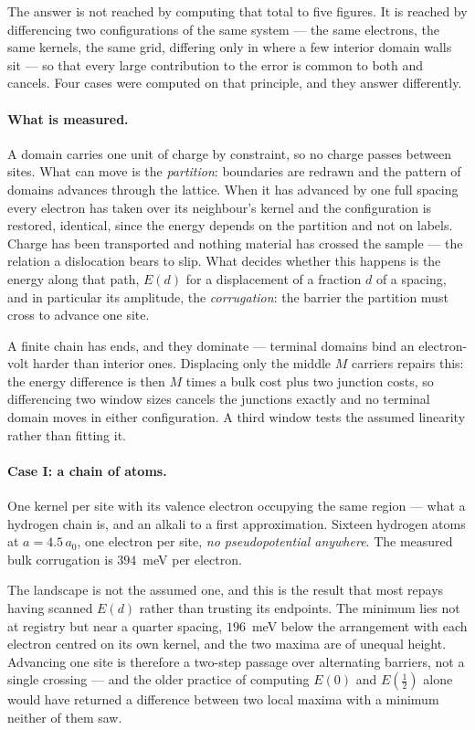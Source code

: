 The answer is not reached by computing that total to five figures. It is reached by differencing two
configurations of the same system --- the same electrons, the same kernels, the same grid, differing
only in where a few interior domain walls sit --- so that every large contribution to the error is
common to both and cancels. Four cases were computed on that principle, and they answer differently.

\paragraph{What is measured.}
A domain carries one unit of charge by constraint, so no charge passes between sites. What can move
is the \emph{partition}: boundaries are redrawn and the pattern of domains advances through the
lattice. When it has advanced by one full spacing every electron has taken over its neighbour's
kernel and the configuration is restored, identical, since the energy depends on the partition and
not on labels. Charge has been transported and nothing material has crossed the sample --- the
relation a dislocation bears to slip. What decides whether this happens is the energy along that
path, $E(d)$ for a displacement of a fraction $d$ of a spacing, and in particular its amplitude, the
\emph{corrugation}: the barrier the partition must cross to advance one site.

A finite chain has ends, and they dominate --- terminal domains bind an electron-volt harder than
interior ones. Displacing only the middle $M$ carriers repairs this: the energy difference is then
$M$ times a bulk cost plus two junction costs, so differencing two window sizes cancels the
junctions exactly and no terminal domain moves in either configuration. A third window tests the
assumed linearity rather than fitting it.

\paragraph{Case I: a chain of atoms.}
One kernel per site with its valence electron occupying the same region --- what a hydrogen chain
is, and an alkali to a first approximation. Sixteen hydrogen atoms at $a=4.5\,a_0$, one electron per
site, \emph{no pseudopotential anywhere}. The measured bulk corrugation is $394$~meV per electron.

The landscape is not the assumed one, and this is the result that most repays having scanned $E(d)$
rather than trusting its endpoints. The minimum lies not at registry but near a quarter spacing,
$196$~meV below the arrangement with each electron centred on its own kernel, and the two maxima are
of unequal height. Advancing one site is therefore a two-step passage over alternating barriers, not
a single crossing --- and the older practice of computing $E(0)$ and $E(\tfrac12)$ alone would have
returned a difference between two local maxima with a minimum neither of them saw.

